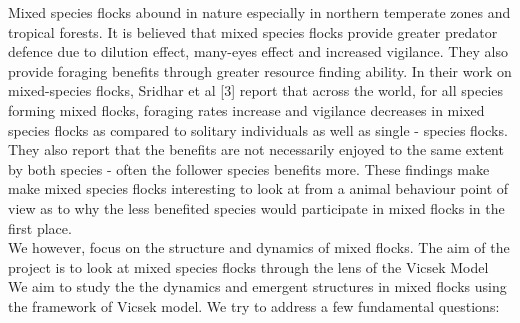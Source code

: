 \documentclass[12pt,a4paper]{article}
\begin{document}
Mixed species flocks abound in nature especially in northern temperate zones and tropical forests. It is believed that mixed species flocks provide greater predator defence due to dilution effect, many-eyes effect and increased vigilance. They also provide foraging benefits through greater resource finding ability. In their work on mixed-species flocks, Sridhar et al [3] report that across the world, for all species forming mixed flocks, foraging rates increase and vigilance decreases in mixed species flocks as compared to solitary individuals as well as single - species flocks. They also report that the benefits are not necessarily enjoyed to the same extent by both species - often the follower species benefits more. These findings make make mixed species flocks interesting to look at from a animal behaviour point of view as to why the less benefited species would participate in mixed flocks in the first place.
\\
We however, focus on the structure and dynamics of mixed flocks. 
The aim of the project is to look at mixed species flocks through the lens of the Vicsek Model  We aim to study the the dynamics and emergent structures in mixed flocks using the framework of Vicsek model. We try to address a few fundamental questions:
\end{document}
